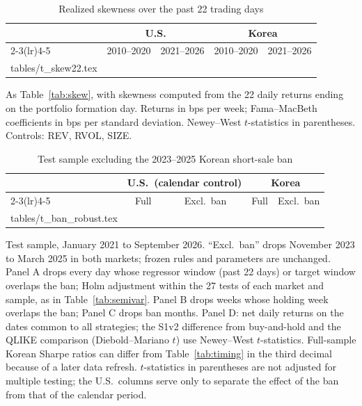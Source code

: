 \documentclass[11pt]{article}
\makeatletter
\newcommand\inputtable[1]{\@@input #1 }
\makeatother
\begin{document}
\begin{table}[!htbp]
\centering
\begin{threeparttable}
\caption{Realized skewness over the past 22 trading days}\label{tab:skew22}
\scriptsize
\begin{tabular}{lcccc}
\toprule
 & \multicolumn{2}{c}{U.S.} & \multicolumn{2}{c}{Korea} \\
\cmidrule(lr){2-3}\cmidrule(lr){4-5}
 & 2010--2020 & 2021--2026 & 2010--2020 & 2021--2026 \\
\midrule
\inputtable{tables/t_skew22.tex}
\bottomrule
\end{tabular}
\begin{tablenotes}\footnotesize
\item As Table~\ref{tab:skew}, with skewness computed from the 22 daily returns ending on the portfolio formation day. Returns in bps per week; Fama--MacBeth coefficients in bps per standard deviation. Newey--West $t$-statistics in parentheses. Controls: REV, RVOL, SIZE.
\end{tablenotes}
\end{threeparttable}
\end{table}

\begin{table}[!htbp]
\centering
\begin{threeparttable}
\caption{Test sample excluding the 2023--2025 Korean short-sale ban}\label{tab:banrobust}
\scriptsize
\begin{tabular}{lcccc}
\toprule
 & \multicolumn{2}{c}{U.S.\ (calendar control)} & \multicolumn{2}{c}{Korea} \\
\cmidrule(lr){2-3}\cmidrule(lr){4-5}
 & Full & Excl.\ ban & Full & Excl.\ ban \\
\midrule
\inputtable{tables/t_ban_robust.tex}
\bottomrule
\end{tabular}
\begin{tablenotes}\footnotesize
\item Test sample, January 2021 to September 2026. ``Excl.\ ban'' drops November 2023 to March 2025 in both markets; frozen rules and parameters are unchanged. Panel A drops every day whose regressor window (past 22 days) or target window overlaps the ban; Holm adjustment within the 27 tests of each market and sample, as in Table~\ref{tab:semivar}. Panel B drops weeks whose holding week overlaps the ban; Panel C drops ban months. Panel D: net daily returns on the dates common to all strategies; the S1v2 difference from buy-and-hold and the QLIKE comparison (Diebold--Mariano $t$) use Newey--West $t$-statistics. Full-sample Korean Sharpe ratios can differ from Table~\ref{tab:timing} in the third decimal because of a later data refresh. $t$-statistics in parentheses are not adjusted for multiple testing; the U.S.\ columns serve only to separate the effect of the ban from that of the calendar period.
\end{tablenotes}
\end{threeparttable}
\end{table}
\end{document}
